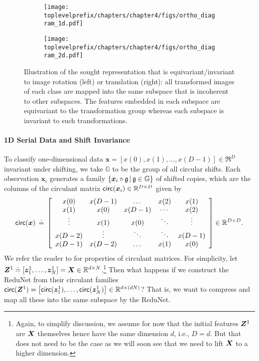 \documentclass[\toplevelprefix/book-main.tex]{subfiles}
\begin{document}
\begin{figure}[t]
    \begin{subfigure}[t]{0.4\textwidth}
        \centering 
        \texttt{[image: \\toplevelprefix/chapters/chapter4/figs/ortho\_diagram\_1d.pdf]}
    \end{subfigure}
    \hfill 
    \begin{subfigure}[t]{0.4\textwidth}
        \centering 
        \texttt{[image: \\toplevelprefix/chapters/chapter4/figs/ortho\_diagram\_2d.pdf]}
    \end{subfigure}
    \caption{Illustration of the sought representation that is equivariant/invariant to image rotation (left) or translation (right): all transformed images of each class are mapped into the same subspace that is incoherent to other subspaces. The features embedded in each subspace are equivariant to the transformation group whereas each subspace is invariant to such transformations.}\label{fig:ortho-invariance-diagram} 
\end{figure}

\paragraph{1D Serial Data and  Shift Invariance} To classify one-dimensional data $\bm x = [x(0), x(1), \ldots, x(D-1)] \in \Re^D$ invariant under shifting, we take $\mathbb{G}$ to be the group of all circular shifts. Each observation $\bm x_i$ generates a family $\{ \bm{x}_i \circ \mathfrak{g} \, | \, \mathfrak{g} \in \mathbb G \}$ of shifted copies, which are the columns of the circulant matrix $\mathsf{circ}(\bm x_i) \in \mathbb{R}^{D \times D}$ given by
\begin{equation}
\mathsf{circ}(\bm{x}) \,\doteq\, \left[ \begin{array}{ccccc} x(0) & x(D-1) & \dots & x(2) & x(1) \\ x(1) & x(0) & x(D-1) & \cdots & x(2) \\ \vdots & x(1) & x(0) &\ddots & \vdots \\ x(D-2) &  \vdots & \ddots & \ddots & x(D-1) \\ x(D-1) & x(D-2) & \dots & x(1) & x(0)   \end{array} \right]  \in \mathbb{R}^{D \times D}.
\end{equation}
We refer the reader to \cite{Kra2012OnCM} for properties of circulant matrices. For simplicity, let $\bm Z^1 \doteq [ \bm{z}_{1}^1, \dots, \bm{z}_{N}^1 ] = \bm{X} \in \mathbb{R}^{d \times N}$.\footnote{Again, to simplify discussion, we assume for now that the initial features $\bm{Z}^1$ are $\bm{X}$ themselves hence have the same dimension $d$, i.e., $D=d$. But that does not need to be the case as we will soon see that we need to lift $\bm{X}$ to a higher dimension.} Then what happens if we construct the ReduNet from their circulant families $\mathsf{circ}(\bm Z^1) = \left[ \mathsf{circ}(\bm{z}_{1}^1), \dots, \mathsf{circ}(\bm{z}_{N}^1) \right] \in \mathbb{R}^{d \times (dN)}$? That is, we want to compress and map all these into the same subspace by the ReduNet. 
\end{document}
